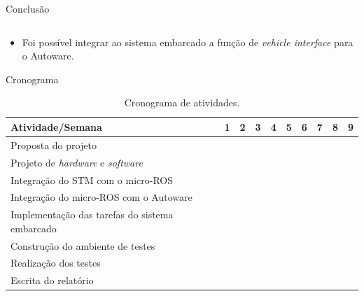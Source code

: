 \documentclass{if-beamer}
\begin{document}
\begin{frame}{Conclusão}
\begin{columns}
	\end{columns}

\pause

	\begin{block}{}
		
		\begin{itemize}
			\item Foi possível integrar ao sistema embarcado a função de \textit{vehicle interface} para o Autoware.
			
		\end{itemize}
		
	\end{block}
	
\end{frame}


\begin{frame}{Cronograma}
	
	
	\begin{table}
		\centering
		\small{
			\begin{tabular}{|b|b|b|b|b|b|b|b|b|b|}
				\hline
				\textbf{Atividade/Semana} & 1 \cellcolor{lightgray} & \textbf{2} \cellcolor{lightgray} & 3 \cellcolor{lightgray} & \textbf{4} \cellcolor{lightgray} & 5 \cellcolor{lightgray} & 6 \cellcolor{lightgray} & \textbf{7} \cellcolor{lightgray} & 8\cellcolor{lightgray} & \textbf{9} \cellcolor{lightgray}\\
				\hline
				Proposta do projeto  & \cellcolor{unifeiblue} &  &  &  &  &  &  &  &  \\
				\hline
				Projeto de \textit{hardware} e \textit{software}  &  & \cellcolor{unifeiblue} & \cellcolor{unifeiblue} &  &  &  &  &  &  \\
				\hline
				Integração do STM com o micro-ROS  &  & \cellcolor{unifeiblue} &  &  &  &  &  &  &  \\
				\hline
				Integração do micro-ROS com o Autoware  &  &  & \cellcolor{unifeiblue} & \cellcolor{unifeiblue} & \cellcolor{unifeiblue} &  &  &  &  \\
				\hline
				Implementação das tarefas do sistema embarcado  &  &  &  & \cellcolor{unifeiblue} & \cellcolor{unifeiblue} & \cellcolor{unifeiblue} & \cellcolor{unifeiblue} &  &  \\
				\hline
				Construção do ambiente de testes  &  &  &  &  & \cellcolor{unifeiblue} & \cellcolor{unifeiblue} & \cellcolor{unifeiblue} &  &  \\
				\hline
				Realização dos testes  &  &  &  &  &  &  & \cellcolor{unifeiblue} & \cellcolor{unifeiblue} & \cellcolor{unifeiblue} \\
				\hline
				Escrita do relatório  &   & \cellcolor{unifeiblue} & \cellcolor{unifeiblue} & \cellcolor{unifeiblue} & \cellcolor{unifeiblue} & \cellcolor{unifeiblue} & \cellcolor{unifeiblue} & \cellcolor{unifeiblue} & \cellcolor{unifeiblue} \\
				\hline
			\end{tabular}
		}
		\caption{Cronograma de atividades.}
		\label{tab:crono}
	\end{table}
	

\end{frame}
\end{document}

